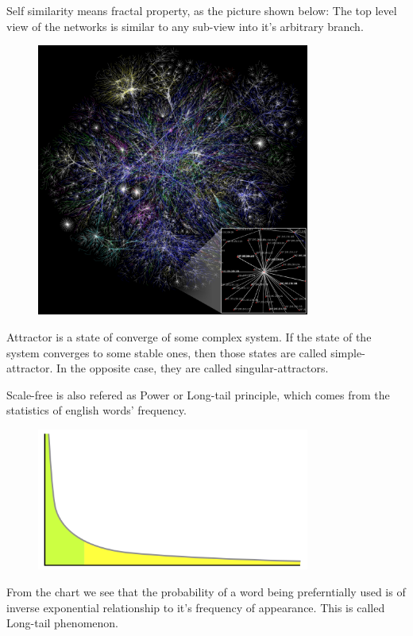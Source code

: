 \documentclass[UTF8, 11pt, a4paper]{ctexart}
\begin{document}
Self similarity means fractal property, as the picture shown below: The top level view of the networks is similar to any sub-view into it's arbitrary branch.
\begin{figure}[H]
	\centering
\includegraphics[width=0.80\textwidth]{complexnet}
\caption{}
\end{figure}
Attractor is a state of converge of some complex system. If the state of the system converges to some stable ones, then those states are called simple-attractor. In the opposite case, they are called singular-attractors.

Scale-free is also refered as Power or Long-tail principle, which comes from the statistics of english words' frequency.
\begin{figure}[H]
	\centering
\includegraphics[width=0.80\textwidth]{powerlaw}
\caption{}
\end{figure}
From the chart we see that the probability of a word being preferntially used is of inverse exponential relationship to it's frequency of appearance. This is called Long-tail 
phenomenon.
\end{document}
